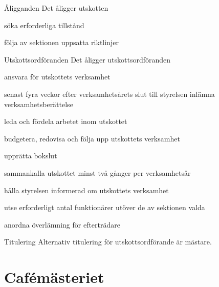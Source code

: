 \documentclass[pdfbookmarks,a4paper,11pt]{article}
\newlength{\itemcollength}
\newenvironment{reglemlista}{%
  \begin{list}{}{%
      \setlength{\labelwidth}{\itemcollength}%
      \setlength{\leftmargin}{\labelwidth + \labelsep}%
      \renewcommand{\makelabel}[1]{%
        \raisebox{0pt}[1ex][0pt]{%
          \makebox[\labelwidth][l]{%
            \parbox[t]{\itemcollength}{%
              \raggedright\hspace{0pt}##1}}}\hfill}%
      }}{%
  \end{list}}
\begin{document}
\begin{reglemlista}

	\item[Åligganden]
	Det åligger utskotten
	\begin{attlista}
		\item söka erforderliga tillstånd
		\item följa av sektionen uppsatta riktlinjer
	\end{attlista}

	\item[Utskottsordföranden]
	Det åligger utskottsordföranden
	\begin{attlista}
		\item ansvara för utskottets verksamhet
		\item senast fyra veckor efter verksamhetsårets slut till styrelsen inlämna verksamhetsberättelse
		\item leda och fördela arbetet inom utskottet
		\item budgetera, redovisa och följa upp utskottets verksamhet
		\item upprätta bokslut
		\item sammankalla utskottet minst två gånger per verksamhetsår
		\item hålla styrelsen informerad om utskottets verksamhet
		\item utse erforderligt antal funktionärer utöver de av sektionen valda
		\item anordna överlämning för efterträdare
	\end{attlista}

	\item[Titulering]
	Alternativ titulering för utskottsordförande är mästare.

\end{reglemlista}

\section{Cafémästeriet}
\end{document}
